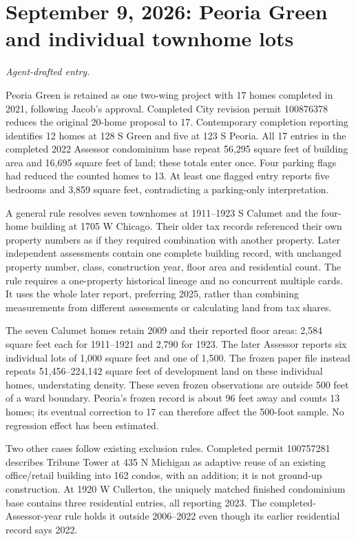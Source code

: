 \clearpage
\section*{September 9, 2026: Peoria Green and individual townhome lots}
\textit{Agent-drafted entry.}

Peoria Green is retained as one two-wing project with 17 homes completed in 2021, following Jacob's approval. Completed City revision permit 100876378 reduces the original 20-home proposal to 17. Contemporary completion reporting identifies 12 homes at 128 S Green and five at 123 S Peoria. All 17 entries in the completed 2022 Assessor condominium base repeat 56,295 square feet of building area and 16,695 square feet of land; these totals enter once. Four parking flags had reduced the counted homes to 13. At least one flagged entry reports five bedrooms and 3,859 square feet, contradicting a parking-only interpretation.

A general rule resolves seven townhomes at 1911--1923 S Calumet and the four-home building at 1705 W Chicago. Their older tax records referenced their own property numbers as if they required combination with another property. Later independent assessments contain one complete building record, with unchanged property number, class, construction year, floor area and residential count. The rule requires a one-property historical lineage and no concurrent multiple cards. It uses the whole later report, preferring 2025, rather than combining measurements from different assessments or calculating land from tax shares.

The seven Calumet homes retain 2009 and their reported floor areas: 2,584 square feet each for 1911--1921 and 2,790 for 1923. The later Assessor reports six individual lots of 1,000 square feet and one of 1,500. The frozen paper file instead repeats 51,456--224,142 square feet of development land on these individual homes, understating density. These seven frozen observations are outside 500 feet of a ward boundary. Peoria's frozen record is about 96 feet away and counts 13 homes; its eventual correction to 17 can therefore affect the 500-foot sample. No regression effect has been estimated.

Two other cases follow existing exclusion rules. Completed permit 100757281 describes Tribune Tower at 435 N Michigan as adaptive reuse of an existing office/retail building into 162 condos, with an addition; it is not ground-up construction. At 1920 W Cullerton, the uniquely matched finished condominium base contains three residential entries, all reporting 2023. The completed-Assessor-year rule holds it outside 2006--2022 even though its earlier residential record says 2022.

